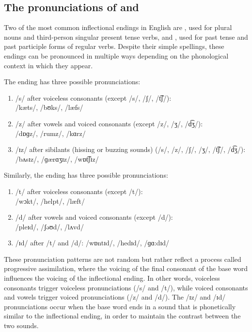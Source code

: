\subsection{The pronunciations of  and }

Two of the most common inflectional endings in English are , used for plural nouns and third-person singular present tense verbs, and , used for past tense and past participle forms of regular verbs. Despite their simple spellings, these endings can be pronounced in multiple ways depending on the phonological context in which they appear.

The  ending has three possible pronunciations:

\begin{enumerate}[noitemsep]
    \item /s/ after voiceless consonants (except /s/, /ʃ/, /t͡ʃ/): \\ /kæts/,  /bʊks/,  /læfs/
    \item /z/ after vowels and voiced consonants (except /z/, /ʒ/, /d͡ʒ/): \\ /dɒɡz/,  /rumz/,  /kɑrz/
    \item /ɪz/ after sibilants (hissing or buzzing sounds) (/s/, /z/, /ʃ/, /ʒ/, /t͡ʃ/, /d͡ʒ/):  /bʌsɪz/,  /ɡærɑʒɪz/,  /wɒt͡ʃɪz/
\end{enumerate}

Similarly, the  ending has three possible pronunciations:

\begin{enumerate}[noitemsep]
    \item /t/ after voiceless consonants (except /t/): \\ /wɔkt/,  /helpt/,  /læft/
    \item /d/ after vowels and voiced consonants (except /d/): \\ /pleɪd/,  /ʃəʊd/,  /lʌvd/
    \item /ɪd/ after /t/ and /d/:  /wɒntɪd/,  /hedɪd/,  /ɡɑ:dɪd/
\end{enumerate}

These pronunciation patterns are not random but rather reflect a process called progressive assimilation, where the voicing of the final consonant of the base word influences the voicing of the inflectional ending. In other words, voiceless consonants trigger voiceless pronunciations (/s/ and /t/), while voiced consonants and vowels trigger voiced pronunciations (/z/ and /d/). The /ɪz/ and /ɪd/ pronunciations occur when the base word ends in a sound that is phonetically similar to the inflectional ending, in order to maintain the contrast between the two sounds.

